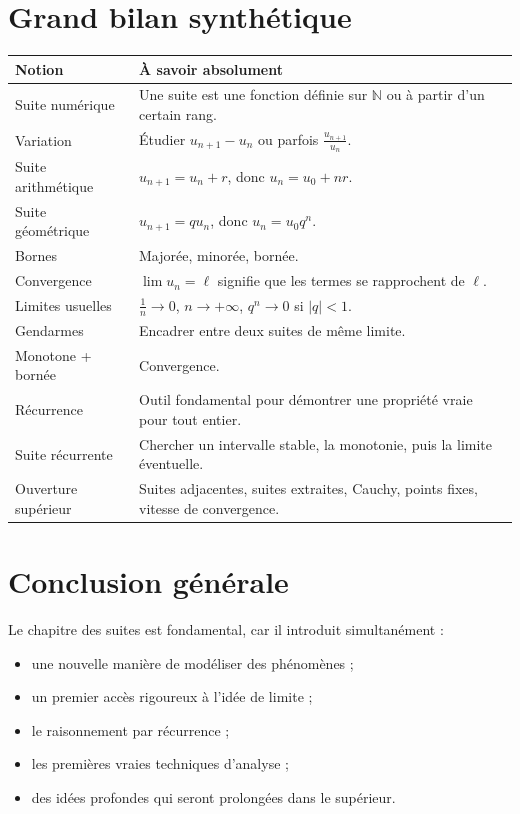 \documentclass[11pt,a4paper]{article}
\theoremstyle{definition}
\theoremstyle{plain}
\theoremstyle{remark}
\newcommand{\N}{\mathbb{N}}
\begin{document}
\section{Grand bilan synthétique}

\begin{center}
\renewcommand{\arraystretch}{1.6}
\begin{tabularx}{\textwidth}{|>{\raggedright\arraybackslash}p{4.4cm}|X|}
\hline
\textbf{Notion} & \textbf{À savoir absolument} \\
\hline
Suite numérique & Une suite est une fonction définie sur $\N$ ou à partir d'un certain rang. \\
\hline
Variation & Étudier $u_{n+1}-u_n$ ou parfois $\frac{u_{n+1}}{u_n}$. \\
\hline
Suite arithmétique & $u_{n+1}=u_n+r$, donc $u_n=u_0+nr$. \\
\hline
Suite géométrique & $u_{n+1}=qu_n$, donc $u_n=u_0q^n$. \\
\hline
Bornes & Majorée, minorée, bornée. \\
\hline
Convergence & $\lim u_n=\ell$ signifie que les termes se rapprochent de $\ell$. \\
\hline
Limites usuelles & $\frac1n\to0$, $n\to+\infty$, $q^n\to0$ si $|q|<1$. \\
\hline
Gendarmes & Encadrer entre deux suites de même limite. \\
\hline
Monotone + bornée & Convergence. \\
\hline
Récurrence & Outil fondamental pour démontrer une propriété vraie pour tout entier. \\
\hline
Suite récurrente & Chercher un intervalle stable, la monotonie, puis la limite éventuelle. \\
\hline
Ouverture supérieur & Suites adjacentes, suites extraites, Cauchy, points fixes, vitesse de convergence. \\
\hline
\end{tabularx}
\end{center}

\section*{Conclusion générale}

Le chapitre des suites est fondamental, car il introduit simultanément :
\begin{itemize}[leftmargin=0.8cm]
    \item une nouvelle manière de modéliser des phénomènes ;
    \item un premier accès rigoureux à l'idée de limite ;
    \item le raisonnement par récurrence ;
    \item les premières vraies techniques d'analyse ;
    \item des idées profondes qui seront prolongées dans le supérieur.
\end{itemize}
\end{document}
